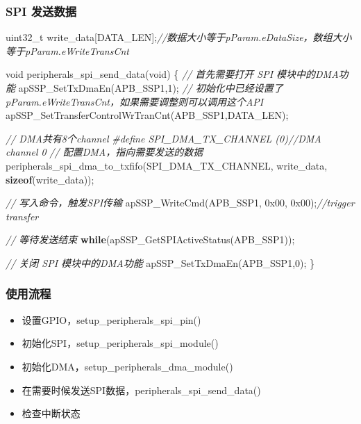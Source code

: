 \documentclass[
  12pt,
]{book}
\newenvironment{Shaded}{\begin{snugshade}}{\end{snugshade}}
\newcommand{\BaseNTok}[1]{\textcolor[rgb]{0.00,0.00,0.81}{#1}}
\newcommand{\CommentTok}[1]{\textcolor[rgb]{0.56,0.35,0.01}{\textit{#1}}}
\newcommand{\ControlFlowTok}[1]{\textcolor[rgb]{0.13,0.29,0.53}{\textbf{#1}}}
\newcommand{\DataTypeTok}[1]{\textcolor[rgb]{0.13,0.29,0.53}{#1}}
\newcommand{\DecValTok}[1]{\textcolor[rgb]{0.00,0.00,0.81}{#1}}
\newcommand{\KeywordTok}[1]{\textcolor[rgb]{0.13,0.29,0.53}{\textbf{#1}}}
\newcommand{\NormalTok}[1]{#1}
\newcommand{\PreprocessorTok}[1]{\textcolor[rgb]{0.56,0.35,0.01}{\textit{#1}}}
\providecommand{\tightlist}{%
  \setlength{\itemsep}{0pt}\setlength{\parskip}{0pt}}
\begin{document}
\hypertarget{spi-ux53d1ux9001ux6570ux636e-1}{%
\subsubsection{SPI 发送数据}\label{spi-ux53d1ux9001ux6570ux636e-1}}

\begin{Shaded}
\begin{Highlighting}[]
\DataTypeTok{uint32_t}\NormalTok{ write_data[DATA_LEN];}\CommentTok{//数据大小等于pParam.eDataSize，数组大小等于pParam.eWriteTransCnt}

\DataTypeTok{void}\NormalTok{ peripherals_spi_send_data(}\DataTypeTok{void}\NormalTok{)}
\NormalTok{\{}
  \CommentTok{// 首先需要打开 SPI 模块中的DMA功能}
\NormalTok{  apSSP_SetTxDmaEn(APB_SSP1,}\DecValTok{1}\NormalTok{);}
  \CommentTok{// 初始化中已经设置了pParam.eWriteTransCnt，如果需要调整则可以调用这个API}
\NormalTok{  apSSP_SetTransferControlWrTranCnt(APB_SSP1,DATA_LEN);}
  
  \CommentTok{// DMA共有8个channel}
  \PreprocessorTok{#define SPI_DMA_TX_CHANNEL   (0)}\CommentTok{//DMA channel 0}
  \CommentTok{// 配置DMA，指向需要发送的数据}
\NormalTok{  peripherals_spi_dma_to_txfifo(SPI_DMA_TX_CHANNEL, write_data, }\KeywordTok{sizeof}\NormalTok{(write_data));}
  
  \CommentTok{// 写入命令，触发SPI传输}
\NormalTok{  apSSP_WriteCmd(APB_SSP1, }\BaseNTok{0x00}\NormalTok{, }\BaseNTok{0x00}\NormalTok{);}\CommentTok{//trigger transfer}

  \CommentTok{// 等待发送结束}
  \ControlFlowTok{while}\NormalTok{(apSSP_GetSPIActiveStatus(APB_SSP1));}
  
  \CommentTok{// 关闭 SPI 模块中的DMA功能}
\NormalTok{  apSSP_SetTxDmaEn(APB_SSP1,}\DecValTok{0}\NormalTok{);}
\NormalTok{\}}
\end{Highlighting}
\end{Shaded}

\hypertarget{ux4f7fux7528ux6d41ux7a0b-10}{%
\subsubsection{使用流程}\label{ux4f7fux7528ux6d41ux7a0b-10}}

\begin{itemize}
\tightlist
\item
  设置GPIO，setup\_peripherals\_spi\_pin()
\item
  初始化SPI，setup\_peripherals\_spi\_module()
\item
  初始化DMA，setup\_peripherals\_dma\_module()
\item
  在需要时候发送SPI数据，peripherals\_spi\_send\_data()
\item
  检查中断状态
\end{itemize}
\end{document}
